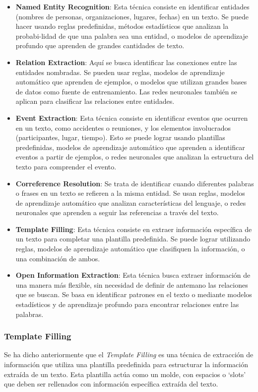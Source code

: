 \begin{itemize}
    \item \textbf{Named Entity Recognition}: Esta técnica consiste en identificar 
    entidades (nombres de personas, organizaciones, lugares, fechas) en un texto. 
    Se puede hacer usando reglas predefinidas, métodos estadísticos que analizan 
    la probabi-lidad de que una palabra sea una entidad, o modelos de aprendizaje 
    profundo que aprenden de grandes cantidades de texto.
    \item \textbf{Relation Extraction}: Aquí se busca identificar las conexiones 
    entre las entidades nombradas. Se pueden usar reglas, modelos de aprendizaje 
    automático que aprenden de ejemplos, o modelos que utilizan grandes bases de 
    datos como fuente de entrenamiento. Las redes neuronales también se aplican 
    para clasificar las relaciones entre entidades.
    \item \textbf{Event Extraction}: Esta técnica consiste en identificar eventos 
    que ocurren en un texto, como accidentes o reuniones, y los elementos 
    involucrados (participantes, lugar, tiempo). Esto se puede lograr usando plantillas 
    predefinidas, modelos de aprendizaje automático que aprenden a identificar eventos 
    a partir de ejemplos, o redes neuronales que analizan la estructura del texto para 
    comprender el evento.
    \item \textbf{Correference Resolution}: Se trata de identificar cuando diferentes 
    palabras o frases en un texto se refieren a la misma entidad. Se usan reglas, 
    modelos de aprendizaje automático que analizan características del lenguaje, 
    o redes neuronales que aprenden a seguir las referencias a través del texto.
    \item \textbf{Template Filling}: Esta técnica consiste en extraer información 
    específica de un texto para completar una plantilla predefinida. Se puede lograr 
    utilizando reglas, modelos de aprendizaje automático que clasifiquen la información, 
    o una combinación de ambos.
    \item \textbf{Open Information Extraction}: Esta técnica busca extraer información 
    de una manera más flexible, sin necesidad de definir de antemano las relaciones 
    que se buscan. Se basa en identificar patrones en el texto o mediante modelos 
    estadísticos y de aprendizaje profundo para encontrar relaciones entre las palabras.
\end{itemize}


\subsubsection{Template Filling}
Se ha dicho anteriormente que el \textit{Template Filling} es una técnica de extracción 
de información que utiliza una plantilla predefinida para estructurar la información 
extraída de un texto. Esta plantilla actúa como un molde, con espacios o `slots' que 
deben ser rellenados con información específica extraída del texto.

